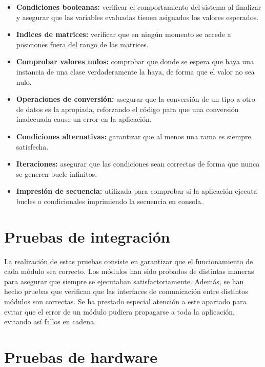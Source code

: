 	\begin{itemize}
		\item \textbf{Condiciones booleanas:} verificar el comportamiento del sistema al finalizar y asegurar que las variables evaluadas tienen asignados los valores esperados.

		\item \textbf{Indices de matrices:} verificar que en ningún momento se accede a posiciones fuera del rango de las matrices.

		\item \textbf{Comprobar valores nulos:} comprobar que donde se espera que haya una instancia de una clase verdaderamente la haya, de forma que el valor no sea nulo.

		\item \textbf{Operaciones de conversión:} asegurar que la conversión de un tipo a otro de datos es la apropiada, reforzando el código para que una conversión inadecuada cause un error en la aplicación.

		\item \textbf{Condiciones alternativas:} garantizar que al menos una rama es siempre satisfecha.

		\item \textbf{Iteraciones:} asegurar que las condiciones sean correctas de forma que nunca se generen bucle infinitos.

		\item \textbf{Impresión de secuencia:} utilizada para comprobar si la aplicación ejecuta bucles o condicionales imprimiendo la secuencia en consola.
	\end{itemize}

\section{Pruebas de integración}

	La realización de estas pruebas consiste en garantizar que el funcionamiento de cada módulo sea correcto. Los módulos han sido probados de distintas maneras para asegurar que siempre se ejecutaban satisfactoriamente. Además, se han hecho pruebas que verifican que las interfaces de comunicación entre distintos módulos son correctas. Se ha prestado especial atención a este apartado para evitar que el error de un módulo pudiera propagarse a toda la aplicación, evitando así fallos en cadena.

\section{Pruebas de hardware}

